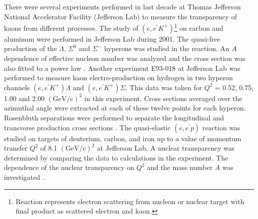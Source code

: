 %
%
There were several experiments performed in last decade at Thomas Jefferson National Accelerator Facility (Jefferson Lab) to measure the transparency of kaons from different processes. The study of $(e,e^\prime K^+)$\footnote{Reaction represents electron scattering from nucleon or nuclear target with final product as scattered electron and kaon.} on carbon and aluminum were performed in Jefferson Lab during 2001. The quasi-free production of the $\Lambda$, $\Sigma^0$ and $\Sigma^-$ hyperons was studied in the reaction. An $A$ dependence of effective nucleon number was analyzed and the cross section was also fitted to a power law \cite{hinton01}. Another experiment E93-018 at Jefferson Lab was performed to measure kaon electro-production on hydrogen in two hyperon channels $(e,e^\prime K^+)\Lambda$ and $(e,e^\prime K^+)\Sigma$. This data was taken for $Q^2$ = 0.52, 0.75, 1.00 and 2.00 $\mathrm{(GeV/c)^2}$ in this experiment. Cross sections averaged over the azimuthal angle were extracted at each of these twelve points for each hyperon. Rosenbluth separations were performed to separate the longitudinal and transverse production cross sections \cite{RM99}. The quasi-elastic $(e,e^\prime p)$ reaction was studied on targets of deuterium, carbon, and iron up to a value of momentum transfer $Q^2$ of 8.1 $\mathrm{(GeV/c)^2}$ at Jefferson Lab. A nuclear transparency was determined by comparing the data to calculations in the experiment. The dependence of the nuclear transparency on $Q^2$ and the mass number $A$ was investigated \cite{jlabp2}. 
%

